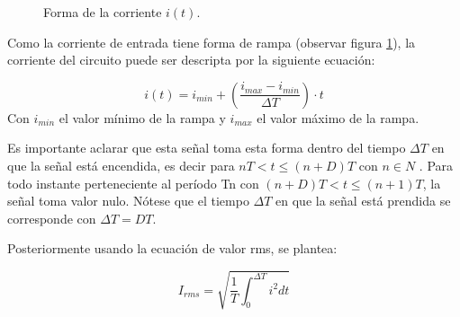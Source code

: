 \documentclass{article}
\begin{document}
\begin{figure}[H]
    \centering
    \caption{Forma de la corriente \(i(t)\).}
    \label{fig:senal_diente_sierra}
\end{figure}
Como la corriente de entrada tiene forma de rampa (observar figura \ref{fig:senal_diente_sierra}), la corriente del circuito puede ser descripta por la siguiente ecuación:

\begin{equation*}
i(t) = i_{min} + (\frac{i_{max}-i_{min}}{\Delta T})\cdot t
\end{equation*}
Con $i_{min}$ el valor mínimo de la rampa y $i_{max}$ el valor máximo de la rampa.

Es importante aclarar que esta señal toma esta forma dentro del tiempo $ \Delta T$ en que la señal está encendida, es decir para  $nT< t \leq (n+D)T$ con $n \in N$  . Para todo instante perteneciente al período Tn con $(n+D)T < t \le (n+1)T $, la señal toma valor nulo. Nótese que el tiempo $ \Delta T $ en que la señal está prendida se corresponde con $ \Delta T = DT $.

Posteriormente usando la ecuación de valor rms, se plantea:

\begin{equation}
    I_{rms}= \sqrt{\frac{1}{T} \int_{0}^{\Delta T}{i^2 dt}} 
    \label{eq:IRMS}
\end{equation}
\end{document}

